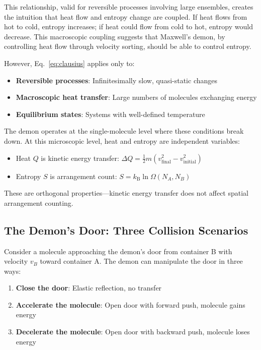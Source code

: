 \documentclass[10pt,twocolumn,letterpaper]{article}
\theoremstyle{definition}
\theoremstyle{remark}
\newcommand{\kb}{k_\text{B}}
\newcommand{\Om}{\Omega}
\begin{document}
This relationship, valid for reversible processes involving large ensembles, creates the intuition that heat flow and entropy change are coupled. If heat flows from hot to cold, entropy increases; if heat could flow from cold to hot, entropy would decrease. This macroscopic coupling suggests that Maxwell's demon, by controlling heat flow through velocity sorting, should be able to control entropy.

However, Eq.~\eqref{eq:clausius} applies only to:
\begin{itemize}
\item \textbf{Reversible processes}: Infinitesimally slow, quasi-static changes
\item \textbf{Macroscopic heat transfer}: Large numbers of molecules exchanging energy
\item \textbf{Equilibrium states}: Systems with well-defined temperature
\end{itemize}

The demon operates at the single-molecule level where these conditions break down. At this microscopic level, heat and entropy are independent variables:
\begin{itemize}
\item Heat $Q$ is kinetic energy transfer: $\Delta Q = \frac{1}{2}m(v_{\text{final}}^2 - v_{\text{initial}}^2)$
\item Entropy $S$ is arrangement count: $S = \kb \ln \Om(N_A, N_B)$
\end{itemize}

These are orthogonal properties—kinetic energy transfer does not affect spatial arrangement counting.

\subsection{The Demon's Door: Three Collision Scenarios}

Consider a molecule approaching the demon's door from container B with velocity $v_B$ toward container A. The demon can manipulate the door in three ways:

\begin{enumerate}
\item \textbf{Close the door}: Elastic reflection, no transfer
\item \textbf{Accelerate the molecule}: Open door with forward push, molecule gains energy
\item \textbf{Decelerate the molecule}: Open door with backward push, molecule loses energy
\end{enumerate}
\end{document}
